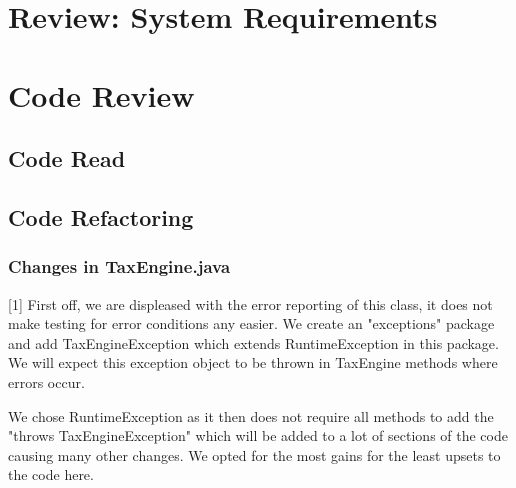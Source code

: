 \documentclass[11pt]{article}
\begin{document}
%


\section{Review: System Requirements}

\section{Code Review}

\subsection{Code Read}

\subsection{Code Refactoring}



\subsubsection{Changes in TaxEngine.java}

[1] First off, we are displeased with the error reporting of this class, it does not make testing for error conditions any easier. We create an "exceptions" package and add TaxEngineException which extends RuntimeException in this package. We will expect this exception object to be thrown in TaxEngine methods where errors occur. 

We chose RuntimeException as it then does not require all methods to add the "throws TaxEngineException" which will be added to a lot of sections of the code causing many other changes. We opted for the most gains for the least upsets to the code here. 
\end{document}
